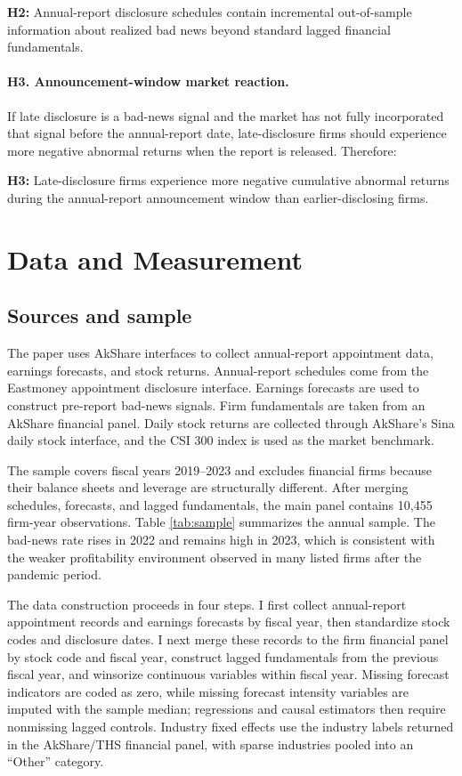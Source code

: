 \documentclass[10pt]{article}
\begin{document}
\noindent \textbf{H2:} Annual-report disclosure schedules contain incremental out-of-sample information about realized bad news beyond standard lagged financial fundamentals.

\paragraph{H3. Announcement-window market reaction.}
If late disclosure is a bad-news signal and the market has not fully incorporated that signal before the annual-report date, late-disclosure firms should experience more negative abnormal returns when the report is released. Therefore:

\noindent \textbf{H3:} Late-disclosure firms experience more negative cumulative abnormal returns during the annual-report announcement window than earlier-disclosing firms.

\section{Data and Measurement}

\subsection{Sources and sample}

The paper uses AkShare interfaces to collect annual-report appointment data, earnings forecasts, and stock returns. Annual-report schedules come from the Eastmoney appointment disclosure interface. Earnings forecasts are used to construct pre-report bad-news signals. Firm fundamentals are taken from an AkShare financial panel. Daily stock returns are collected through AkShare's Sina daily stock interface, and the CSI 300 index is used as the market benchmark.

The sample covers fiscal years 2019--2023 and excludes financial firms because their balance sheets and leverage are structurally different. After merging schedules, forecasts, and lagged fundamentals, the main panel contains 10,455 firm-year observations. Table \ref{tab:sample} summarizes the annual sample. The bad-news rate rises in 2022 and remains high in 2023, which is consistent with the weaker profitability environment observed in many listed firms after the pandemic period.

The data construction proceeds in four steps. I first collect annual-report appointment records and earnings forecasts by fiscal year, then standardize stock codes and disclosure dates. I next merge these records to the firm financial panel by stock code and fiscal year, construct lagged fundamentals from the previous fiscal year, and winsorize continuous variables within fiscal year. Missing forecast indicators are coded as zero, while missing forecast intensity variables are imputed with the sample median; regressions and causal estimators then require nonmissing lagged controls. Industry fixed effects use the industry labels returned in the AkShare/THS financial panel, with sparse industries pooled into an ``Other'' category.
\end{document}
